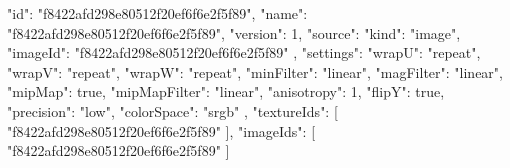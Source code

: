 {
  "id": "f8422afd298e80512f20ef6f6e2f5f89",
  "name": "f8422afd298e80512f20ef6f6e2f5f89",
  "version": 1,
  "source": {
    "kind": "image",
    "imageId": "f8422afd298e80512f20ef6f6e2f5f89"
  },
  "settings": {
    "wrapU": "repeat",
    "wrapV": "repeat",
    "wrapW": "repeat",
    "minFilter": "linear",
    "magFilter": "linear",
    "mipMap": true,
    "mipMapFilter": "linear",
    "anisotropy": 1,
    "flipY": true,
    "precision": "low",
    "colorSpace": "srgb"
  },
  "textureIds": [
    "f8422afd298e80512f20ef6f6e2f5f89"
  ],
  "imageIds": [
    "f8422afd298e80512f20ef6f6e2f5f89"
  ]
}
